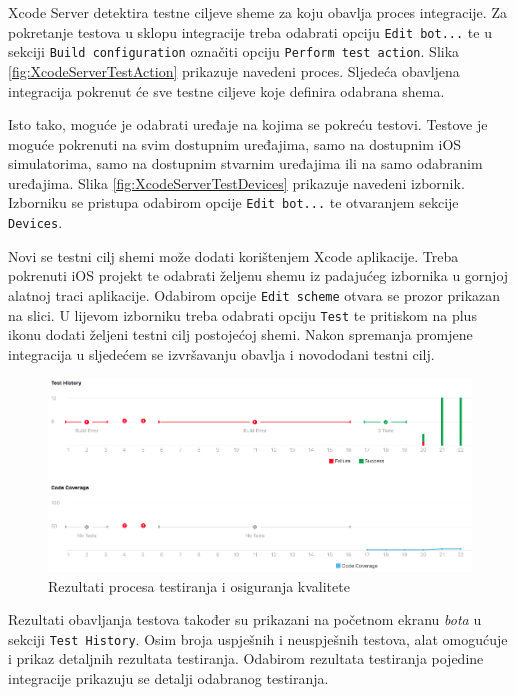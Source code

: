 \documentclass[times, utf8, diplomski, numeric]{fer}
\begin{document}
Xcode Server detektira testne ciljeve sheme za koju obavlja proces integracije. Za pokretanje testova u sklopu integracije treba odabrati opciju \verb|Edit bot...| te u sekciji \verb|Build configuration| označiti opciju \verb|Perform test action|. Slika \ref{fig:XcodeServerTestAction} prikazuje navedeni proces. Sljedeća obavljena integracija pokrenut će sve testne ciljeve koje definira odabrana shema.

Isto tako, moguće je odabrati uređaje na kojima se pokreću testovi. Testove je moguće pokrenuti na svim dostupnim uređajima, samo na dostupnim iOS simulatorima, samo na dostupnim stvarnim uređajima ili na samo odabranim uređajima. Slika \ref{fig:XcodeServerTestDevices} prikazuje navedeni izbornik. Izborniku se pristupa odabirom opcije \verb|Edit bot...| te otvaranjem sekcije \verb|Devices|.

Novi se testni cilj shemi može dodati korištenjem Xcode aplikacije. Treba pokrenuti iOS projekt te odabrati željenu shemu iz padajućeg izbornika u gornjoj alatnoj traci aplikacije. Odabirom opcije \verb|Edit scheme| otvara se prozor prikazan na slici. U lijevom izborniku treba odabrati opciju \verb|Test| te pritiskom na plus ikonu dodati željeni testni cilj postojećoj shemi. Nakon spremanja promjene integracija u sljedećem se izvršavanju obavlja i novododani testni cilj.

\begin{figure}[b!]
\centering
\includegraphics[scale=0.4]{XcodeServerTestResult}
\caption{Rezultati procesa testiranja i osiguranja kvalitete}
\label{fig:XcodeServerTestResult}
\end{figure}

Rezultati obavljanja testova također su prikazani na početnom ekranu \textit{bota} u sekciji \verb|Test History|. Osim broja uspješnih i neuspješnih testova, alat omogućuje i prikaz detaljnih rezultata testiranja. Odabirom rezultata testiranja pojedine integracije prikazuju se detalji odabranog testiranja.
\end{document}
